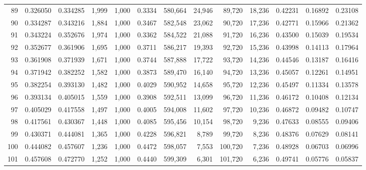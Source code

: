 \begin{tabular}{rrrrrrrrrrrrr}
89  &  0.326050 &  0.334285 &   1,999 &  1,000 &                                     0.3334 &  580,664 &   24,946 &   89,720 &   18,236 &  0.42231 &  0.16892 &  0.23108 \\
90  &  0.334287 &  0.343216 &   1,884 &  1,000 &                                     0.3467 &  582,548 &   23,062 &   90,720 &   17,236 &  0.42771 &  0.15966 &  0.21362 \\
91  &  0.343224 &  0.352676 &   1,974 &  1,000 &                                     0.3362 &  584,522 &   21,088 &   91,720 &   16,236 &  0.43500 &  0.15039 &  0.19534 \\
92  &  0.352677 &  0.361906 &   1,695 &  1,000 &                                     0.3711 &  586,217 &   19,393 &   92,720 &   15,236 &  0.43998 &  0.14113 &  0.17964 \\
93  &  0.361908 &  0.371939 &   1,671 &  1,000 &                                     0.3744 &  587,888 &   17,722 &   93,720 &   14,236 &  0.44546 &  0.13187 &  0.16416 \\
94  &  0.371942 &  0.382252 &   1,582 &  1,000 &                                     0.3873 &  589,470 &   16,140 &   94,720 &   13,236 &  0.45057 &  0.12261 &  0.14951 \\
95  &  0.382254 &  0.393130 &   1,482 &  1,000 &                                     0.4029 &  590,952 &   14,658 &   95,720 &   12,236 &  0.45497 &  0.11334 &  0.13578 \\
96  &  0.393134 &  0.405015 &   1,559 &  1,000 &                                     0.3908 &  592,511 &   13,099 &   96,720 &   11,236 &  0.46172 &  0.10408 &  0.12134 \\
97  &  0.405029 &  0.417558 &   1,497 &  1,000 &                                     0.4005 &  594,008 &   11,602 &   97,720 &   10,236 &  0.46872 &  0.09482 &  0.10747 \\
98  &  0.417561 &  0.430367 &   1,448 &  1,000 &                                     0.4085 &  595,456 &   10,154 &   98,720 &    9,236 &  0.47633 &  0.08555 &  0.09406 \\
99  &  0.430371 &  0.444081 &   1,365 &  1,000 &                                     0.4228 &  596,821 &    8,789 &   99,720 &    8,236 &  0.48376 &  0.07629 &  0.08141 \\
100 &  0.444082 &  0.457607 &   1,236 &  1,000 &                                     0.4472 &  598,057 &    7,553 &  100,720 &    7,236 &  0.48928 &  0.06703 &  0.06996 \\
101 &  0.457608 &  0.472770 &   1,252 &  1,000 &                                     0.4440 &  599,309 &    6,301 &  101,720 &    6,236 &  0.49741 &  0.05776 &  0.05837 \\

\end{tabular}
